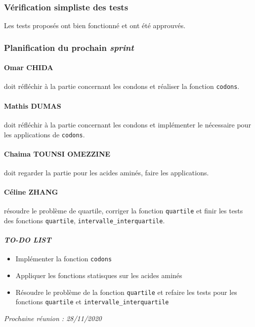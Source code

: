 \subsubsection*{Vérification simpliste des tests}
Les tests proposés ont bien fonctionné et ont été approuvés.

\subsubsection*{Planification du prochain \textsl{sprint}}
\paragraph*{Omar CHIDA} doit réfléchir à la partie concernant les condons et réaliser la fonction \texttt{codons}.

\paragraph*{Mathis DUMAS} doit réfléchir à la partie concernant les condons et implémenter le nécessaire pour les applications de \texttt{codons}.

\paragraph*{Chaima TOUNSI OMEZZINE} doit regarder la partie pour les acides aminés, faire les applications.

\paragraph*{Céline ZHANG} résoudre le problème de quartile, corriger la fonction \texttt{quartile} et finir les tests des fonctions \texttt{quartile}, \texttt{intervalle\_interquartile}.

\paragraph{\emph{TO-DO LIST}}
\begin{itemize}
    \item Implémenter la fonction \texttt{codons}
    \item Appliquer les fonctions statisques sur les acides aminés
    \item Résoudre le problème de la fonction \texttt{quartile} et refaire les tests pour les fonctions \texttt{quartile} et \texttt{intervalle\_interquartile}
\end{itemize}

\emph{Prochaine réunion : 28/11/2020}\\

% 
